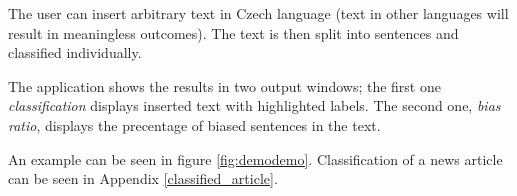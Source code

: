 The user can insert arbitrary text in Czech language (text in other languages will result in meaningless outcomes). The text is then split into sentences and classified individually.

The application shows the results in two output windows; the first one \textit{classification} displays inserted text with highlighted labels. The second one, \textit{bias ratio}, displays the precentage of biased sentences in the text.

An example can be seen in figure \ref{fig:demodemo}. 
Classification of a news article can be seen in Appendix \ref{classified_article}.

\begin{figure}
\end{figure}



